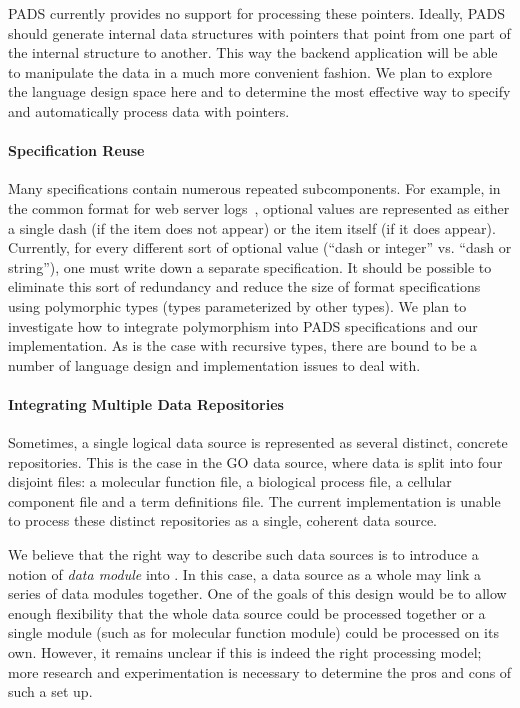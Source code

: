 \documentclass[11pt]{article}
\begin{document}
PADS currently provides no support for processing these pointers.
Ideally, PADS should generate internal
data structures with pointers that point from one part
of the internal structure to another.  This way the backend application
will be able to manipulate the data in a much more convenient fashion.
We plan to explore the language design space here and to determine
the most effective way to specify and automatically process data
with pointers.  

\paragraph*{Specification Reuse}
Many specifications contain numerous repeated subcomponents.  For
example, in the common format for web server logs~\cite{wpp}, optional
values are represented as either a single dash (if the item does not
appear) or the item itself (if it does appear).  Currently, for every
different sort of optional value (\ie ``dash or integer'' vs. ``dash
or string''), one must write down a separate specification.  It should
be possible to eliminate this sort of redundancy and reduce the size
of format specifications using polymorphic types (types parameterized
by other types).  We plan to investigate how to integrate
polymorphism into PADS specifications and our implementation.
As is the case with recursive types, there are bound to be
a number of language design and implementation issues to deal with.


\paragraph*{Integrating Multiple Data Repositories}
Sometimes, a single logical data source is represented
as several distinct, concrete repositories.   This is the case
in the GO data source, where data is split into four disjoint
files: a molecular function file, a biological process file,
a cellular component file and a term definitions file.
The current \pads{} implementation is unable to process
these distinct repositories as a single, coherent data source.


We believe that the right way to describe such data sources
is to introduce a notion of {\em data module} into \pads{}.
In this case, a data source as a whole may link
a series of data modules together.  One of the goals
of this design would be to allow enough flexibility that
the whole data source could be processed together or a single module
(such as for molecular function module) could be processed on its own.
However, it remains unclear if this is indeed the right processing model;
more research and experimentation is necessary to determine the
pros and cons of such a set up.
\end{document}
